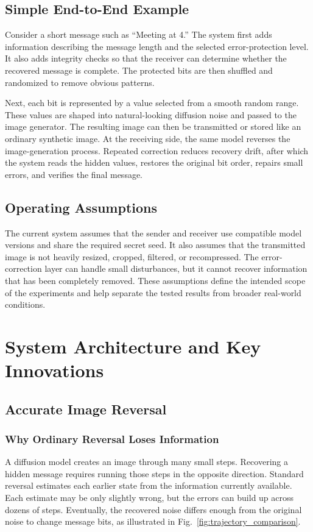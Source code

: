 \documentclass[conference]{IEEEtran}
\begin{document}
\subsection{Simple End-to-End Example}
Consider a short message such as ``Meeting at 4.'' The system first adds information describing the message length and the selected error-protection level. It also adds integrity checks so that the receiver can determine whether the recovered message is complete. The protected bits are then shuffled and randomized to remove obvious patterns.

Next, each bit is represented by a value selected from a smooth random range. These values are shaped into natural-looking diffusion noise and passed to the image generator. The resulting image can then be transmitted or stored like an ordinary synthetic image. At the receiving side, the same model reverses the image-generation process. Repeated correction reduces recovery drift, after which the system reads the hidden values, restores the original bit order, repairs small errors, and verifies the final message.

\subsection{Operating Assumptions}
The current system assumes that the sender and receiver use compatible model versions and share the required secret seed. It also assumes that the transmitted image is not heavily resized, cropped, filtered, or recompressed. The error-correction layer can handle small disturbances, but it cannot recover information that has been completely removed. These assumptions define the intended scope of the experiments and help separate the tested results from broader real-world conditions.

\section{System Architecture and Key Innovations}

\subsection{Accurate Image Reversal}

\subsubsection{Why Ordinary Reversal Loses Information}
A diffusion model creates an image through many small steps. Recovering a hidden message requires running those steps in the opposite direction. Standard reversal estimates each earlier state from the information currently available. Each estimate may be only slightly wrong, but the errors can build up across dozens of steps. Eventually, the recovered noise differs enough from the original noise to change message bits, as illustrated in Fig.~\ref{fig:trajectory_comparison}.
\end{document}
